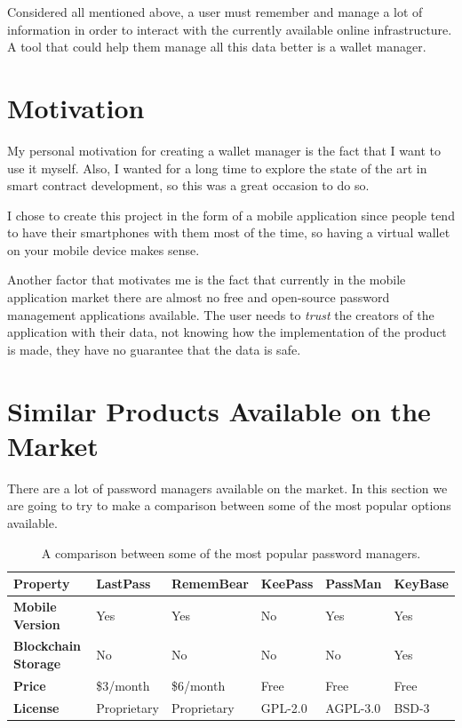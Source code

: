 \documentclass[a4paper,12pt]{report}
\begin{document}
Considered all mentioned above, a user must remember and manage a lot of
information in order to interact with the currently available online
infrastructure. A tool that could help them manage all this data better is a
wallet manager.

\section{Motivation}

My personal motivation for creating a wallet manager is the fact that I want to
use it myself. Also, I wanted for a long time to explore the state of the art
in smart contract development, so this was a great occasion to do so.

I chose to create this project in the form of a mobile application since people
tend to have their smartphones with them most of the time, so having a virtual
wallet on your mobile device makes sense.

Another factor that motivates me is the fact that currently in the mobile
application market there are almost no free and open-source password management
applications available. The user needs to \textit{trust} the creators of the
application with their data, not knowing how the implementation of the product
is made, they have no guarantee that the data is safe.

\section{Similar Products Available on the Market}

There are a lot of password managers available on the market. In this section
we are going to try to make a comparison between some of the most popular
options available.

\begin{table}[h!]
    \centering
    \begin{tabular}{ | l | l | l | l | l | l | }
        \hline
        \textbf{Property}           & \textbf{LastPass} & \textbf{RememBear} & \textbf{KeePass} & \textbf{PassMan} & \textbf{KeyBase} \\
        \hline
        \textbf{Mobile Version}     & Yes               & Yes                & No               & Yes              & Yes              \\
        \hline
        \textbf{Blockchain Storage} & No                & No                 & No               & No               & Yes              \\
        \hline
        \textbf{Price}              & \$3/month         & \$6/month          & Free             & Free             & Free             \\
        \hline
        \textbf{License}            & Proprietary       & Proprietary        & GPL-2.0          & AGPL-3.0         & BSD-3            \\
        \hline
    \end{tabular}
    \caption{A comparison between some of the most popular password managers.}\label{tab:otherProducts}
\end{table}
\end{document}
